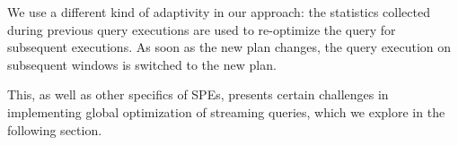 We use a different kind of adaptivity in our approach: the statistics collected during previous query executions are used to re-optimize the query for subsequent executions. As soon as the new plan changes, the query execution on subsequent windows is switched to the new plan. 

This, as well as other specifics of SPEs, presents certain challenges in implementing global optimization of streaming queries, which we explore in the following section.

